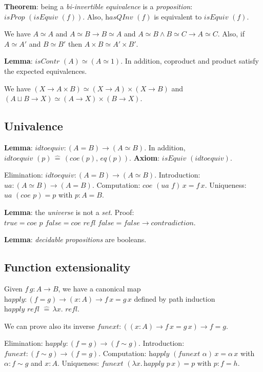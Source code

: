 \documentclass[a4paper]{article}
\begin{document}
\textbf{Theorem}: being a \textit{bi-invertible equivalence} is a \textit{proposition}: $\textit{isProp }(\textit{isEquiv }(f))$. Also, $\textit{hasQInv }(f)$ is equivalent to $\textit{isEquiv }(f)$.

We have $A \simeq A$ and $A \simeq B \to B \simeq A$ and $A \simeq B \wedge B \simeq C \to A \simeq C$. Also, if $A \simeq A'$ and $B \simeq B'$ then $A \times B \simeq A' \times B'$.

\textbf{Lemma}: $\textit{isContr }(A) \simeq (A \simeq 1)$. In addition, coproduct and product satisfy the expected equivalences.

We have $(X \to A \times B) \simeq (X \to A) \times (X \to B)$ and $(A \sqcup B  \to X) \simeq (A \to X) \times (B \to X)$.

\subsection*{Univalence}

\textbf{Lemma}: $\textit{idtoequiv} : (A = B) \to (A \simeq B)$. In addition, $\textit{idtoequiv }(p) \, \hat{=} \, (\textit{coe}(p), \, \textit{eq}(p))$. \textbf{Axiom}: $\textit{isEquiv }(\textit{idtoequiv})$.

Elimination: $\textit{idtoequiv} : (A = B) \to (A \simeq B)$. Introduction: $\textit{ua} : (A \simeq B) \to (A = B)$. Computation: $\textit{coe }(\textit{ua } f) \, x = f \, x$. Uniqueness: $\textit{ua }(\textit{coe } p) = p$ with $p : A = B$.

\textbf{Lemma}: the \textit{universe} is not a \textit{set}. Proof: $\textit{true} = \textit{coe } p \textit{ false} = \textit{coe } \textit{refl } \textit{false} = \textit{false} \to \textit{contradiction}$.

\textbf{Lemma}: \textit{decidable} \textit{propositions} are booleans.

\subsection*{Function extensionality}

Given $f \, g : A \to B$, we have a canonical map $\textit{happly} : (f = g) \to (x : A) \to f \, x = g \, x$ defined by path induction $\textit{happly } \textit{refl } \hat{=} \, \lambda x. \textit{ refl}$.

We can prove also its inverse $\textit{funext} : ((x : A) \to f \, x = g \, x) \to f = g$.

Elimination: $\textit{happly} : (f = g) \to (f \sim g)$. Introduction: $\textit{funext} : (f \sim g) \to (f = g)$. Computation: $\textit{happly } (\textit{funext } \alpha) \, x = \alpha \, x$ with $\alpha : f \sim g$ and $x : A$. Uniqueness: $\textit{funext } (\lambda x. \, \textit{happly } p \, x) = p$ with $p : f = h$.
\end{document}

